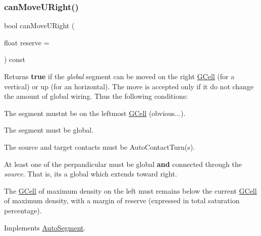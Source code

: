 \mbox{\label{classKatabatic_1_1AutoHorizontal_ad0c972e34d6bac47bd9276a7d6e053d8}} 
\subsubsection{\texorpdfstring{can\+Move\+U\+Right()}{canMoveURight()}}
{\footnotesize\ttfamily bool can\+Move\+U\+Right (\begin{DoxyParamCaption}\item[{float}]{reserve = {} }\end{DoxyParamCaption}) const\hspace{0.3cm}{\ttfamily [virtual]}}

\begin{DoxyReturn}{Returns}
{\bfseries true} if the {\itshape global} segment can be moved on the right \mbox{\hyperlink{classKatabatic_1_1GCell}{G\+Cell}} (for a vertical) or up (for an horizontal). The move is accepted only if it do not change the amount of global wiring. Thus the following conditions\+:
\begin{DoxyItemize}
\item The segment mustn\textquotesingle{}t be on the leftmost \mbox{\hyperlink{classKatabatic_1_1GCell}{G\+Cell}} (obvious...).
\item The segment must be global.
\item The source and target contacts must be Auto\+Contact\+Turn(s).
\item At least one of the perpandicular must be global {\bfseries and} connected through the {\itshape source}. That is, it\textquotesingle{}s a global which extends toward right.
\item The \mbox{\hyperlink{classKatabatic_1_1GCell}{G\+Cell}} of maximum density on the left must remains below the current \mbox{\hyperlink{classKatabatic_1_1GCell}{G\+Cell}} of maximum density, with a margin of {\ttfamily reserve} (expressed in total saturation percentage). 
\end{DoxyItemize}
\end{DoxyReturn}


Implements \mbox{\hyperlink{classKatabatic_1_1AutoSegment_a096deb8a143f098eac2bff9ab9c52243}{Auto\+Segment}}.



